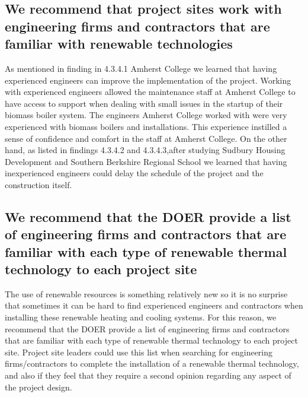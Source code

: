 \subsection{We recommend that project sites work with engineering firms and contractors that are familiar with renewable technologies}
\par As mentioned in finding in 4.3.4.1 Amherst College we learned that having experienced engineers can improve the implementation of the project. Working with experienced engineers allowed the maintenance staff at Amherst College to have access to support when dealing with small issues in the startup of their biomass boiler system. The engineers Amherst College worked with were very experienced with biomass boilers and installations. This experience instilled a sense of confidence and comfort in the staff at Amherst College. On the other hand, as listed in findings 4.3.4.2 and 4.3.4.3,after studying Sudbury Housing Development and Southern Berkshire Regional School we learned that having inexperienced engineers could delay the schedule of the project and the construction itself. 

\subsection{We recommend that the DOER provide a list of engineering firms and contractors that are familiar with each type of renewable thermal technology to each project site}
\par The use of renewable resources is something relatively new so it is no surprise that sometimes it can be hard to find experienced engineers and contractors when installing these renewable heating and cooling systems. For this reason, we recommend that the DOER provide a list of engineering firms and contractors that are familiar with each type of renewable thermal technology to each project site. Project site leaders could use this list when searching for engineering firms/contractors to complete the installation of a renewable thermal technology, and also if they feel that they require a second opinion regarding any aspect of the project design.

